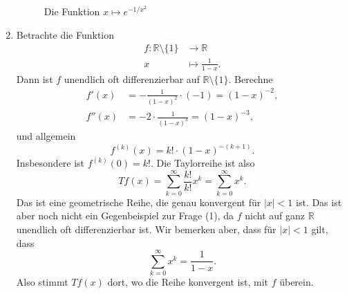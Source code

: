 \documentclass[../main.tex]{subfiles}
\begin{document}
\begin{examples}
\begin{enumerate}[(1)]
      \begin{figure}[htb]
        \centering
        
        \caption{Die Funktion $x \mapsto e^{-1/x^2}$}%
        \label{fig:non-analytic}
      \end{figure}

    \item Betrachte die Funktion
      \begin{align*}
        f \colon \mathbb{R} \setminus \{1\} & \to \mathbb{R} \\
        x & \mapsto \frac{1}{1-x}.
      \end{align*}
      Dann ist $f$ unendlich oft differenzierbar auf
      $\mathbb{R} \setminus \{1\}$. Berechne
      \begin{align*}
        f'(x) & = -\frac{1}{{(1 - x)}^2} \cdot (-1)
        = {(1 - x)}^{-2},\\
        f''(x) &= -2 \cdot \frac{1}{{(1-x)}^3} = {(1 - x)}^{-3},
      \end{align*}
      und allgemein
      \[
        f^{(k)}(x) = k! \cdot {(1 - x)}^{-(k + 1)}.
      \]
      Insbesondere ist $f^{(k)}(0) = k!$. 
      Die Taylorreihe ist also
      \[
        Tf(x) = \sum_{k=0}^{\infty} \frac{k!}{k!} x^k
        = \sum_{k=0}^{\infty} x^k.
      \]
      Das ist eine geometrische Reihe, die genau konvergent für
      $|x| < 1$ ist.
      Das ist aber noch nicht ein Gegenbeispiel zur Frage (1),
      da $f$ nicht auf ganz $\mathbb{R}$ unendlich oft
      differenzierbar ist.
      Wir bemerken aber, dass für $|x| < 1$ gilt, dass
      \[
        \sum_{k=0}^{\infty} x^k = \frac{1}{1-x}.
      \]
      Also stimmt $Tf(x)$ dort, wo die Reihe konvergent ist,
      mit $f$ überein.


\end{enumerate}
\end{examples}
\end{document}

